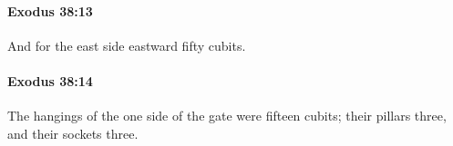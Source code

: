 		\paragraph{Exodus 38:13} %
			\label{EXODUS-38-13}

			And for the east side eastward fifty cubits.


		\paragraph{Exodus 38:14} %
			\label{EXODUS-38-14}

			The hangings of the one side of the gate were fifteen cubits; their pillars three, and their sockets three.


